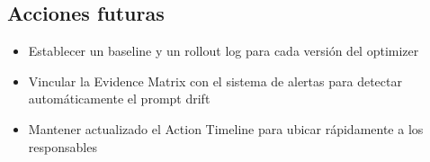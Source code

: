 \subsection{Acciones futuras}

\begin{itemize}
    \item Establecer un baseline y un rollout log para cada versión del optimizer
    \item Vincular la Evidence Matrix con el sistema de alertas para detectar automáticamente el prompt drift
    \item Mantener actualizado el Action Timeline para ubicar rápidamente a los responsables
\end{itemize}



